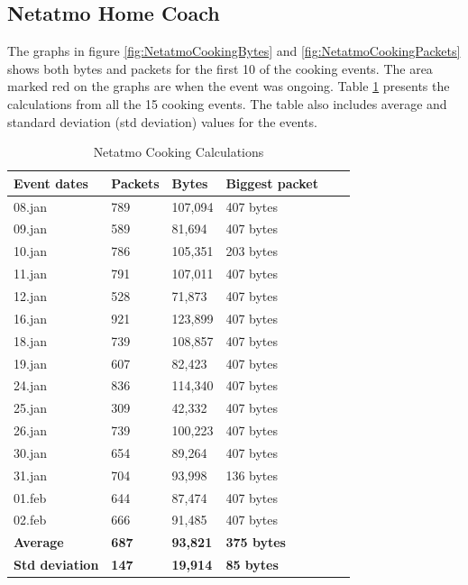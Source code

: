 \subsection{Netatmo Home Coach}
The graphs in figure \ref{fig:NetatmoCookingBytes} and \ref{fig:NetatmoCookingPackets} shows both bytes and packets for the first 10 of the cooking events. The area marked red on the graphs are when the event was ongoing. Table \ref{tab:NetatmoCookingCalculations} presents the calculations from all the 15 cooking events. The table also includes average and standard deviation (std deviation) values for the events. 

\begin{table}[!ht]
    \centering
    \caption{Netatmo Cooking Calculations}
    \begin{tabular}{|l|l|l|l|l|l|}
    \hline
        \textbf{Event dates} & \textbf{Packets} & \textbf{Bytes} & \textbf{Biggest packet} \\ \hline
        08.jan & 789 & 107,094 & 407 bytes \\ \hline
        09.jan & 589 & 81,694 & 407 bytes \\ \hline
        10.jan & 786 & 105,351 & 203 bytes \\ \hline
        11.jan & 791 & 107,011 & 407 bytes \\ \hline
        12.jan & 528 & 71,873 & 407 bytes \\ \hline
        16.jan & 921 & 123,899 & 407 bytes \\ \hline
        18.jan & 739 & 108,857 & 407 bytes  \\ \hline
        19.jan & 607 & 82,423 & 407 bytes \\ \hline
        24.jan & 836 & 114,340 & 407 bytes \\ \hline
        25.jan & 309 & 42,332 & 407 bytes \\ \hline
        26.jan & 739 & 100,223 & 407 bytes \\ \hline
        30.jan & 654 & 89,264 & 407 bytes \\ \hline
        31.jan & 704 & 93,998 & 136 bytes \\ \hline
        01.feb & 644 & 87,474 & 407 bytes \\ \hline
        02.feb & 666 & 91,485 & 407 bytes \\ \hline
        \textbf{Average} &  \textbf{687}  &  \textbf{93,821}  &  \textbf{375 bytes} \\ \hline
        \textbf{Std deviation} &  \textbf{147}  & \textbf{19,914}  &  \textbf{85 bytes} \\ \hline
    \end{tabular}
    \label{tab:NetatmoCookingCalculations}
\end{table}

